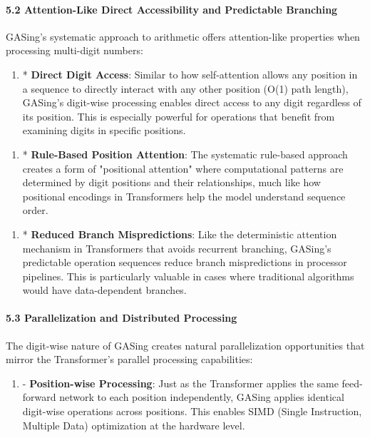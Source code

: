 \documentclass[11pt,a4paper]{article}
\begin{document}
\paragraph{5.2 Attention-Like Direct Accessibility and Predictable Branching}
GASing's systematic approach to arithmetic offers attention-like properties when processing multi-digit numbers:

\begin{enumerate}
  \item * \textbf{Direct Digit Access}: Similar to how self-attention allows any position in a sequence to directly interact with any other position (O(1) path length), GASing's digit-wise processing enables direct access to any digit regardless of its position. This is especially powerful for operations that benefit from examining digits in specific positions.
\end{enumerate}

\begin{enumerate}
  \item * \textbf{Rule-Based Position Attention}: The systematic rule-based approach creates a form of "positional attention" where computational patterns are determined by digit positions and their relationships, much like how positional encodings in Transformers help the model understand sequence order.
\end{enumerate}

\begin{enumerate}
  \item * \textbf{Reduced Branch Mispredictions}: Like the deterministic attention mechanism in Transformers that avoids recurrent branching, GASing's predictable operation sequences reduce branch mispredictions in processor pipelines. This is particularly valuable in cases where traditional algorithms would have data-dependent branches.
\end{enumerate}

\paragraph{5.3 Parallelization and Distributed Processing}
The digit-wise nature of GASing creates natural parallelization opportunities that mirror the Transformer's parallel processing capabilities:

\begin{enumerate}
  \item - \textbf{Position-wise Processing}: Just as the Transformer applies the same feed-forward network to each position independently, GASing applies identical digit-wise operations across positions. This enables SIMD (Single Instruction, Multiple Data) optimization at the hardware level.
\end{enumerate}
\end{document}
